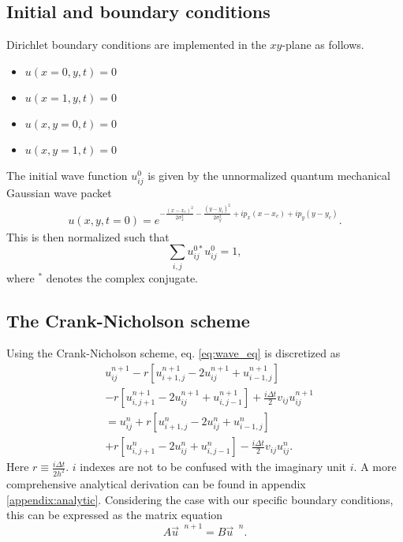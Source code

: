 \documentclass[english,notitlepage,reprint,nofootinbib]{revtex4-1}  %
\begin{document}
\subsection*{Initial and boundary conditions}
Dirichlet boundary conditions are implemented in the $xy$-plane as follows.
\begin{itemize}
    \item $u(x=0,y,t) = 0$
    \item $u(x=1,y,t) = 0$
    \item $u(x,y=0,t) = 0$
    \item $u(x,y=1,t) = 0$
\end{itemize}

The initial wave function $u_{ij}^0$ is given by the unnormalized quantum mechanical Gaussian wave packet
\begin{align}
    u(x,y,t = 0) = e^{-\frac{(x-x_c)^2}{2 \sigma_x^2} -\frac{(y-y_c)^2}{2 \sigma_y^2}+ ip_x (x-x_c)+ ip_y (y-y_c)}.
\end{align}
This is then normalized such that
\begin{equation}
    \sum_{i,j} u_{ij}^{0*} u_{ij}^0 = 1,
\end{equation}
where $^*$ denotes the complex conjugate.
\subsection*{The Crank-Nicholson scheme}
Using the Crank-Nicholson scheme, eq. \ref{eq:wave_eq} is discretized as
\begin{align}
    &u_{ij}^{n+1} - r \left[ u_{i+1,j}^{n+1}- 2 u_{ij}^{n+1} + u_{i-1,j}^{n+1} \right] \\
    &- r \left[ u_{i,j+1}^{n+1}- 2 u_{ij}^{n+1} + u_{i,j-1}^{n+1} \right]
    + \frac{i \Delta t}{2} v_{ij} u_{ij}^{n+1} \\
    &= u_{ij}^n 
    + r \left[ u_{i+1,j}^{n}- 2 u_{ij}^{n} + u_{i-1,j}^{n} \right] \\
    &+ r \left[ u_{i,j+1}^{n}- 2 u_{ij}^{n} + u_{i,j-1}^{n} \right]
    - \frac{i \Delta t}{2} v_{ij} u_{ij}^{n}.
\end{align}
Here $r \equiv \frac{i \Delta t}{2h^2}$. $i$ indexes are not to be confused with the imaginary unit $i$. A more comprehensive analytical derivation can be found in appendix \ref{appendix:analytic}. Considering the case with our specific boundary conditions, this can be expressed as the matrix equation
\begin{equation}
    A \vec{u}^{\text{ }n+1} = B \vec{u}^{\text{ }n}.
\end{equation}
\end{document}
